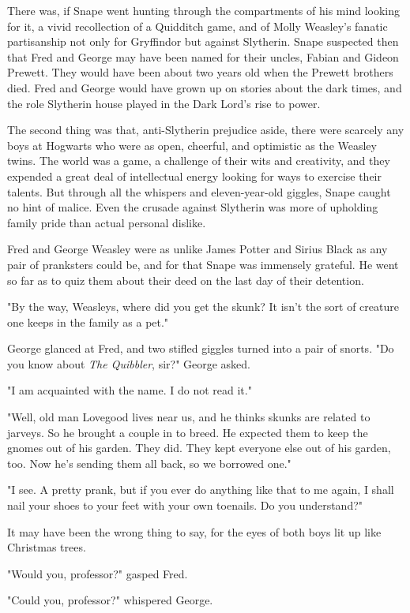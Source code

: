 There was, if Snape went hunting through the compartments of his mind looking for it, a vivid recollection of a Quidditch game, and of Molly Weasley's fanatic partisanship not only for Gryffindor but against Slytherin. Snape suspected then that Fred and George may have been named for their uncles, Fabian and Gideon Prewett. They would have been about two years old when the Prewett brothers died. Fred and George would have grown up on stories about the dark times, and the role Slytherin house played in the Dark Lord's rise to power.

The second thing was that, anti-Slytherin prejudice aside, there were scarcely any boys at Hogwarts who were as open, cheerful, and optimistic as the Weasley twins. The world was a game, a challenge of their wits and creativity, and they expended a great deal of intellectual energy looking for ways to exercise their talents. But through all the whispers and eleven-year-old giggles, Snape caught no hint of malice. Even the crusade against Slytherin was more of upholding family pride than actual personal dislike.

Fred and George Weasley were as unlike James Potter and Sirius Black as any pair of pranksters could be, and for that Snape was immensely grateful. He went so far as to quiz them about their deed on the last day of their detention.

"By the way, Weasleys, where did you get the skunk? It isn't the sort of creature one keeps in the family as a pet."

George glanced at Fred, and two stifled giggles turned into a pair of snorts. "Do you know about \emph{The Quibbler}, sir?" George asked.

"I am acquainted with the name. I do not read it."

"Well, old man Lovegood lives near us, and he thinks skunks are related to jarveys. So he brought a couple in to breed. He expected them to keep the gnomes out of his garden. They did. They kept everyone else out of his garden, too. Now he's sending them all back, so we borrowed one."

"I see. A pretty prank, but if you ever do anything like that to me again, I shall nail your shoes to your feet with your own toenails. Do you understand?"

It may have been the wrong thing to say, for the eyes of both boys lit up like Christmas trees.

"Would you, professor?" gasped Fred.

"Could you, professor?" whispered George.

